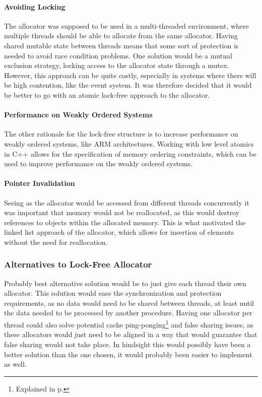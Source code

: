 \paragraph{Avoiding Locking}
The allocator was supposed to be used in a multi-threaded environment, where multiple threads
should be able to allocate from the same allocator.
Having shared mutable state between threads means that some sort of protection is needed
to avoid race condition problems.
One solution would be a mutual exclusion strategy, locking access to the allocator state through a mutex.
However, this approach can be quite costly, especially in systems where there will be high contention,
like the event system.
It was therefore decided that it would be better to go with an atomic lock-free approach to the allocator.

\paragraph{Performance on Weakly Ordered Systems}
The other rationale for the lock-free structure is to increase performance on weakly ordered systems,
like ARM architectures\cite{preshing_weak_vs_strong_memory_models}.
Working with low level atomics in C++ allows for the specification of memory ordering constraints,
which can be used to improve performance on the weakly ordered systems.

\paragraph{Pointer Invalidation}
Seeing as the allocator would be accessed from different threads concurrently it was important that
memory would not be reallocated, as this would destroy references to objects within the allocated memory.
This is what motivated the linked list approach of the allocator, which allows for insertion of elements without
the need for reallocation.


\subsubsection{Alternatives to Lock-Free Allocator}
\label{subsubsec:lock_free_allocator_alternatives}
Probably best alternative solution would be to just give each thread their own allocator.
This solution would ease the synchronization and protection requirements, as no data would need to be shared between threads,
at least until the data needed to be processed by another procedure.
Having one allocator per thread could also solve potential cache ping-ponging\footnote{Explained in p.\pageref{par:detailed_lock_free_ping_pong}}
and false sharing issues, as these allocators
would just need to be aligned in a way that would guarantee that false sharing would not take place.
In hindsight this would possibly have been a better solution than the one chosen, it would probably been easier to implement as well.

